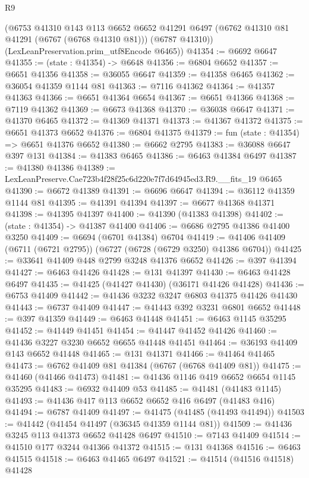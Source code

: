 \begin{lexlean}{R9}
\begin{coremodule}
      (@6753
        @41310
        @143
        @113
        @6652
        @6652
        @41291
        @6497
        (@6762 @41310 @81 @41291 (@6767 (@6768 @41310 @81)))
        (@6787 @41310))
      (LexLeanPreservation.prim_utf8Encode @6465))
@41354 := @6692 @6647
@41355 := (state : @41354) -> @6648
@41356 := @6804 @6652
@41357 := @6651 @41356
@41358 := @36055 @6647
@41359 := @41358 @6465
@41362 := @36054 @41359 @1144 @81
@41363 := @7116 @41362
@41364 := @41357 @41363
@41366 := @6651 @41364 @6654
@41367 := @6651 @41366
@41368 := @7119 @41362
@41369 := @6673 @41368
@41370 := @36038 @6647
@41371 := @41370 @6465
@41372 := @41369 @41371
@41373 := @41367 @41372
@41375 := @6651 @41373 @6652
@41376 := @6804 @41375
@41379 := fun (state : @41354) => @6651 @41376 @6652
@41380 := @6662 @2795
@41383 := @36088 @6647 @397 @131
@41384 := @41383 @6465
@41386 := @6463 @41384 @6497
@41387 := @41380 @41386
@41389 := LexLeanPreserve.Cae723b4f28f25c6d220e7f7d64945ed3.R9.__fits_19 @6465
@41390 := @6672 @41389
@41391 := @6696 @6647
@41394 := @36112 @41359 @1144 @81
@41395 := @41391 @41394
@41397 := @6677 @41368 @41371
@41398 := @41395 @41397
@41400 := @41390 (@41383 @41398)
@41402 := (state : @41354) -> @41387 @41400
@41406 := @6686 @2795 @41386 @41400 @3250
@41409 := @6694 (@6701 @41384) @6704
@41419 := @41406 @41409 (@6711 (@6721 @2795)) (@6727 (@6728 (@6729 @3250) @41386 @6704))
@41425 := @33641 @41409 @448 @2799 @3248 @41376 @6652
@41426 := @397 @41394
@41427 := @6463 @41426
@41428 := @131 @41397
@41430 := @6463 @41428 @6497
@41435 := @41425 (@41427 @41430) (@36171 @41426 @41428)
@41436 := @6753 @41409
@41442 := @41436 @3232 @3247 @6803 @41375 @41426 @41430
@41443 := @6737 @41409
@41447 := @41443 @392 @3231 @6801 @6652
@41448 := @397 @41359
@41449 := @6463 @41448
@41451 := @6463 @1145 @35295
@41452 := @41449 @41451
@41454 := @41447 @41452 @41426
@41460 := @41436 @3227 @3230 @6652 @6655 @41448 @41451
@41464 := @36193 @41409 @143 @6652 @41448
@41465 := @131 @41371
@41466 := @41464 @41465
@41473 := @6762 @41409 @81 @41384 (@6767 (@6768 @41409 @81))
@41475 := @41460 (@41466 @41473)
@41481 := @41436 @1146 @419 @6652 @6654 @1145 @35295
@41483 := @6932 @41409 @53
@41485 := @41481 (@41483 @1145)
@41493 := @41436 @417 @113 @6652 @6652 @416 @6497 (@41483 @416)
@41494 := @6787 @41409
@41497 := @41475 (@41485 (@41493 @41494))
@41503 := @41442 (@41454 @41497 (@36345 @41359 @1144 @81))
@41509 := @41436 @3245 @113 @41373 @6652 @41428 @6497
@41510 := @7143 @41409
@41514 := @41510 @177 @3244 @41366 @41372
@41515 := @131 @41368
@41516 := @6463 @41515
@41518 := @6463 @41465 @6497
@41521 := @41514 (@41516 @41518) @41428

\end{coremodule}
\end{lexlean}
